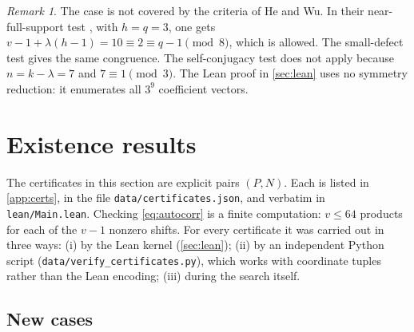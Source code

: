 \documentclass[11pt]{article}
\numberwithin{equation}{section}
\theoremstyle{definition}
\theoremstyle{remark}
\newtheorem{remark}[theorem]{Remark}
\begin{document}
\begin{remark}
The case is not covered by the criteria of He and Wu. In their near-full-support test
\cite[Thm.~4.4]{HeWu2026}, with $h=q=3$, one gets $v-1+\lambda(h-1)=10\equiv 2\equiv q-1\pmod 8$,
which is allowed. The small-defect test \cite[Thm.~4.7]{HeWu2026} gives the same congruence. The
self-conjugacy test does not apply because $n=k-\lambda=7$ and $7\equiv1\pmod 3$. The
Lean proof in \cref{sec:lean} uses no symmetry reduction: it enumerates all $3^9$ coefficient
vectors.
\end{remark}

\section{Existence results}\label{sec:exist}

The certificates in this section are explicit pairs $(P,N)$. Each is listed in \cref{app:certs},
in the file \texttt{data/\allowbreak certificates.json}, and verbatim in \texttt{lean/\allowbreak Main.lean}. Checking
\eqref{eq:autocorr} is a finite computation: $v\le 64$ products for each of the $v-1$ nonzero shifts.
For every certificate it was carried out in three ways: (i) by the Lean kernel (\cref{sec:lean});
(ii) by an independent Python script (\texttt{data/\allowbreak verify\_\allowbreak certificates.py}), which works with
coordinate tuples rather than the Lean encoding; (iii) during the search itself.

\subsection{New cases}
\end{document}
